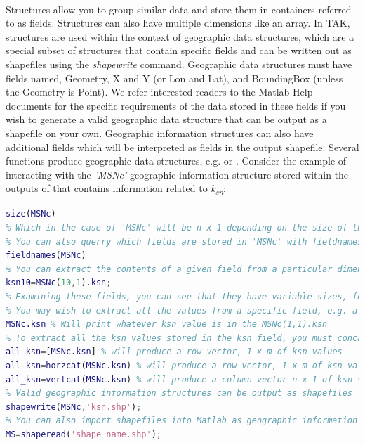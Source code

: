 \paragraph{}Structures allow you to group similar data and store them in containers referred to as fields. Structures can also have multiple dimensions like an array. In TAK, structures are used within the context of geographic data structures, which are a special subset of structures that contain specific fields and can be written out as shapefiles using the \textit{shapewrite} command. Geographic data structures must have fields named, Geometry, X and Y (or Lon and Lat), and BoundingBox (unless the Geometry is Point). We refer interested readers to the Matlab Help documents for the specific requirements of the data stored in these fields if you wish to generate a valid geographic data structure that can be output as a shapefile on your own. Geographic information structures can also have additional fields which will be interpreted as fields in the output shapefile. Several functions produce geographic data structures, e.g.  or . Consider the example of interacting with the \textit{'MSNc'} geographic information structure stored within the outputs of  that contains information related to \textit{k\textsubscript{sn}}:

\begin{lstlisting}[language=Matlab]
% You can querry the dimensions of a structure with size
size(MSNc)
% Which in the case of 'MSNc' will be n x 1 depending on the size of the stream network
% You can also querry which fields are stored in 'MSNc' with fieldnames
fieldnames(MSNc)
% You can extract the contents of a given field from a particular dimension, for example to extract what's stored in the 'ksn' field in the 10th element
ksn10=MSNc(10,1).ksn;
% Examining these fields, you can see that they have variable sizes, for example the 'Geometry' field has a single entry per element that is 'Line', indicating that the shapefile Geometry type is Line, where as the X and Y fields will have n x 1 arrays specifying the X and Y coordinates of line segments
% You may wish to extract all the values from a specific field, e.g. all the normalized steepness values stored in the ksn field, but unlike with a table if you simply call a field without specifying a dimension, you will get the first element, not the entire list of elements
MSNc.ksn % Will print whatever ksn value is in the MSNc(1,1).ksn
% To extract all the ksn values stored in the ksn field, you must concatenate the field values
all_ksn=[MSNc.ksn] % will produce a row vector, 1 x m of ksn values
all_ksn=horzcat(MSNc.ksn) % will produce a row vector, 1 x m of ksn values
all_ksn=vertcat(MSNc.ksn) % will produce a column vector n x 1 of ksn values
% Valid geographic information structures can be output as shapefiles
shapewrite(MSNc,'ksn.shp');
% You can also import shapefiles into Matlab as geographic information structures
MS=shaperead('shape_name.shp');
\end{lstlisting}

